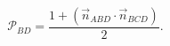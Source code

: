 \documentclass{article}
\begin{document}
\[
    \mathcal{P}_{BD} = \frac{1 + \left( \vec n_{ABD} \cdot \vec n_{BCD}
    \right)}{2}.
\]
\end{document}
